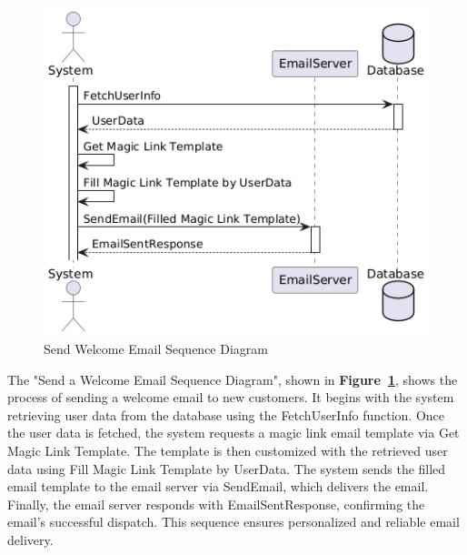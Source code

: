 \begin{figure}[!h]
  \centering
  \includegraphics[width=\textwidth]{images/docs/diagrams/sequence-diagrams/all-sequence-diagrams/Send Welcome Email.png}
  \caption{Send Welcome Email Sequence Diagram}
  \label{fig:seq/send-welcome-email}
\end{figure}

The "Send a Welcome Email Sequence Diagram", shown in \textbf{Figure~\ref{fig:seq/send-welcome-email}}, shows the process of sending a welcome email to new customers. It begins with the system retrieving user data from the database using the FetchUserInfo function. Once the user data is fetched, the system requests a magic link email template via Get Magic Link Template. The template is then customized with the retrieved user data using Fill Magic Link Template by UserData. The system sends the filled email template to the email server via SendEmail, which delivers the email. Finally, the email server responds with EmailSentResponse, confirming the email's successful dispatch. This sequence ensures personalized and reliable email delivery.
